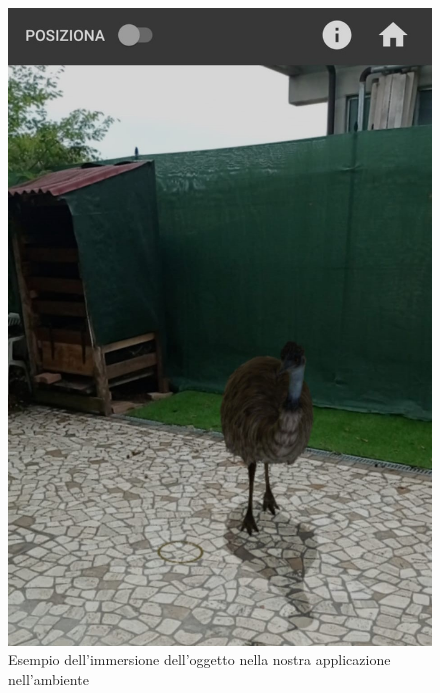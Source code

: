 \documentclass[crop=false, class=book]{standalone}
\begin{document}
	\begin{center}
		\begin{figure}
		\centering
		\includegraphics[scale=0.22]{EUImg1.jpeg} 
		\caption{Esempio dell'immersione dell'oggetto nella nostra 	applicazione nell'ambiente}
	\end{figure}
	
	\end{center}
\end{document}
